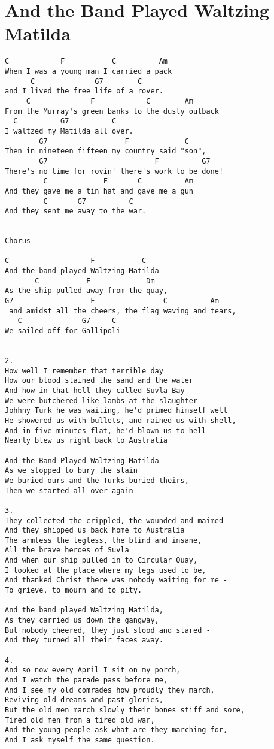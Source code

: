 \documentclass[leqno]{memoir}
\begin{document}
\chapter{And the Band Played Waltzing Matilda}
\begin{verbatim}
C            F           C          Am
When I was a young man I carried a pack
      C              G7        C
and I lived the free life of a rover.
     C              F            C        Am
From the Murray's green banks to the dusty outback
  C          G7          C
I waltzed my Matilda all over.
        G7                  F             C
Then in nineteen fifteen my country said "son",
        G7                         F          G7
There's no time for rovin' there's work to be done!
         C             F       C          Am
And they gave me a tin hat and gave me a gun
         C       G7          C
And they sent me away to the war.


Chorus

C                   F           C
And the band played Waltzing Matilda
       C           F             Dm
As the ship pulled away from the quay,
G7                  F                C          Am
 and amidst all the cheers, the flag waving and tears,
   C              G7     C
We sailed off for Gallipoli


2.
How well I remember that terrible day
How our blood stained the sand and the water
And how in that hell they called Suvla Bay
We were butchered like lambs at the slaughter
Johhny Turk he was waiting, he'd primed himself well
He showered us with bullets, and rained us with shell,
And in five minutes flat, he'd blown us to hell
Nearly blew us right back to Australia

And the Band Played Waltzing Matilda
As we stopped to bury the slain
We buried ours and the Turks buried theirs,
Then we started all over again

3.
They collected the crippled, the wounded and maimed
And they shipped us back home to Australia
The armless the legless, the blind and insane,
All the brave heroes of Suvla
And when our ship pulled in to Circular Quay,
I looked at the place where my legs used to be,
And thanked Christ there was nobody waiting for me -
To grieve, to mourn and to pity.

And the band played Waltzing Matilda,
As they carried us down the gangway,
But nobody cheered, they just stood and stared -
And they turned all their faces away.

4.
And so now every April I sit on my porch,
And I watch the parade pass before me,
And I see my old comrades how proudly they march,
Reviving old dreams and past glories,
But the old men march slowly their bones stiff and sore,
Tired old men from a tired old war,
And the young people ask what are they marching for,
And I ask myself the same question.


\end{verbatim}
\end{document}
